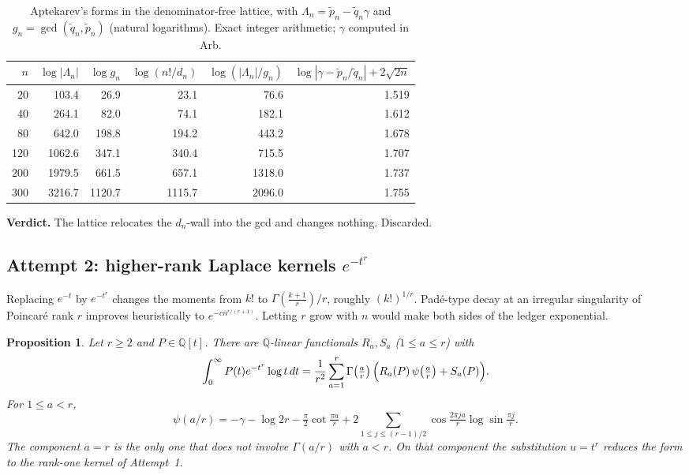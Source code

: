 \documentclass[11pt,a4paper]{article}
\newtheorem{proposition}[theorem]{Proposition}
\theoremstyle{definition}
\theoremstyle{remark}
\newcommand{\Q}{\mathbb Q}
\numberwithin{equation}{section}
\begin{document}
\begin{table}[ht]
\centering
\small
\begin{tabular}{rrrrrr}
\toprule
$n$ & $\log|\Lambda_n|$ & $\log g_n$ & $\log(n!/d_n)$ & $\log(|\Lambda_n|/g_n)$ & $\log|\gamma-\tilde p_n/\tilde q_n|+2\sqrt{2n}$\\
\midrule
20 & 103.4 & 26.9 & 23.1 & 76.6 & 1.519\\
40 & 264.1 & 82.0 & 74.1 & 182.1 & 1.612\\
80 & 642.0 & 198.8 & 194.2 & 443.2 & 1.678\\
120 & 1062.6 & 347.1 & 340.4 & 715.5 & 1.707\\
200 & 1979.5 & 661.5 & 657.1 & 1318.0 & 1.737\\
300 & 3216.7 & 1120.7 & 1115.7 & 2096.0 & 1.755\\
\bottomrule
\end{tabular}
\caption{Aptekarev's forms in the denominator-free lattice, with $\Lambda_n=\tilde p_n-\tilde q_n\gamma$ and $g_n=\gcd(\tilde q_n,\tilde p_n)$ (natural logarithms). Exact integer arithmetic; $\gamma$ computed in Arb.}\label{p4:tab:apt}
\end{table}

\noindent\textbf{Verdict.} The lattice relocates the $d_n$-wall into the gcd and changes nothing. Discarded.

\subsection{\texorpdfstring{Attempt 2: higher-rank Laplace kernels $e^{-t^r}$}{Attempt 2: higher-rank Laplace kernels}}

Replacing $e^{-t}$ by $e^{-t^r}$ changes the moments from $k!$ to $\Gamma(\frac{k+1}r)/r$, roughly $(k!)^{1/r}$. Pad\'e-type decay at an irregular singularity of Poincar\'e rank $r$ improves heuristically to $e^{-cn^{r/(r+1)}}$. Letting $r$ grow with $n$ would make both sides of the ledger exponential.

\begin{proposition}\label{p4:prop:rank}
Let $r\ge2$ and $P\in\Q[t]$. There are $\Q$-linear functionals $R_a,S_a$ ($1\le a\le r$) with
\[
\int_0^\infty P(t)e^{-t^r}\log t\,dt=\frac1{r^2}\sum_{a=1}^r\Gamma\!\left(\tfrac ar\right)\Bigl(R_a(P)\,\psi\!\left(\tfrac ar\right)+S_a(P)\Bigr).
\]
For $1\le a<r$,
\[
\psi(a/r)=-\gamma-\log2r-\tfrac\pi2\cot\tfrac{\pi a}r+2\sum_{1\le j\le(r-1)/2}\cos\tfrac{2\pi ja}r\log\sin\tfrac{\pi j}r .
\]
The component $a=r$ is the only one that does not involve $\Gamma(a/r)$ with $a<r$. On that component the substitution $u=t^r$ reduces the form to the rank-one kernel of Attempt~1.
\end{proposition}
\end{document}
